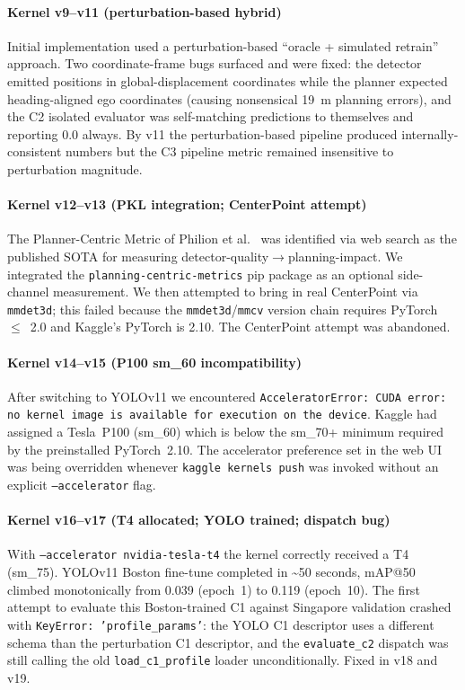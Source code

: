 \documentclass[11pt,a4paper]{article}
\begin{document}
\paragraph{Kernel v9--v11 (perturbation-based hybrid)} Initial
implementation used a perturbation-based ``oracle + simulated retrain''
approach. Two coordinate-frame bugs surfaced and were fixed: the
detector emitted positions in global-displacement coordinates while
the planner expected heading-aligned ego coordinates (causing
nonsensical 19~m planning errors), and the C2 isolated evaluator was
self-matching predictions to themselves and reporting 0.0 always. By
v11 the perturbation-based pipeline produced internally-consistent
numbers but the C3 pipeline metric remained insensitive to
perturbation magnitude.

\paragraph{Kernel v12--v13 (PKL integration; CenterPoint attempt)}
The Planner-Centric Metric of Philion et al.~\cite{philion2020pkl}
was identified via web search as the published SOTA for measuring
detector-quality$\to$planning-impact. We integrated the
\texttt{planning-centric-metrics} pip package as an optional
side-channel measurement. We then attempted to bring in real
CenterPoint via \texttt{mmdet3d}; this failed because the
\texttt{mmdet3d}/\texttt{mmcv} version chain requires PyTorch~$\le$~2.0
and Kaggle's PyTorch is 2.10. The CenterPoint attempt was abandoned.

\paragraph{Kernel v14--v15 (P100 sm\_60 incompatibility)} After
switching to YOLOv11 we encountered \texttt{AcceleratorError: CUDA
error: no kernel image is available for execution on the device}.
Kaggle had assigned a Tesla~P100 (sm\_60) which is below the sm\_70+
minimum required by the preinstalled PyTorch~2.10. The accelerator
preference set in the web UI was being overridden whenever
\texttt{kaggle kernels push} was invoked without an explicit
\texttt{--accelerator} flag.

\paragraph{Kernel v16--v17 (T4 allocated; YOLO trained; dispatch bug)}
With \texttt{--accelerator nvidia-tesla-t4} the kernel correctly
received a T4 (sm\_75). YOLOv11 Boston fine-tune completed in
\textasciitilde50 seconds, mAP@50 climbed monotonically from 0.039
(epoch~1) to 0.119 (epoch~10). The first attempt to evaluate this
Boston-trained C1 against Singapore validation crashed with
\texttt{KeyError: 'profile\_params'}: the YOLO C1 descriptor uses a
different schema than the perturbation C1 descriptor, and the
\texttt{evaluate\_c2} dispatch was still calling the old
\texttt{load\_c1\_profile} loader unconditionally. Fixed in v18 and
v19.
\end{document}
